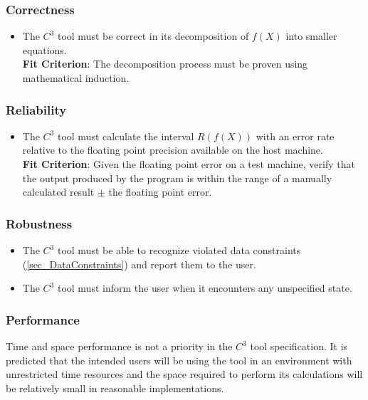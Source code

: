 \documentclass[12pt]{article}
\newcommand{\prognameAbbrv}{$C^{3}$}
\begin{document}
\subsubsection*{Correctness}
\begin{itemize}
	\item The \prognameAbbrv{} tool must be correct in its decomposition of 
	$f(X)$ into smaller equations.\\ \textbf{Fit Criterion}: The decomposition 
	process must be proven using mathematical induction.
\end{itemize}

\subsubsection*{Reliability}
\begin{itemize}
	\item The \prognameAbbrv{} tool must calculate the interval $R(f(X))$ with 
	an error rate relative to the floating point precision available on the 
	host machine. \\ \textbf{Fit Criterion}: Given the floating point error on 
	a test machine, verify that the output produced by the program is within 
	the range of a manually calculated result $\pm$ the floating point error.
\end{itemize}

\subsubsection*{Robustness}
\begin{itemize}
	\item The \prognameAbbrv{} tool must be able to recognize violated data 
	constraints (\ref{sec_DataConstraints}) and report them to the user.
	\item The \prognameAbbrv{} tool must inform the user when it encounters any 
	unspecified state.
\end{itemize}

\subsubsection*{Performance}
Time and space performance is not a priority in the \prognameAbbrv{} tool 
specification. It is predicted that the intended users will be using the tool 
in an environment with unrestricted time resources and the space required to 
perform its calculations will be relatively small in reasonable implementations.
\end{document}
